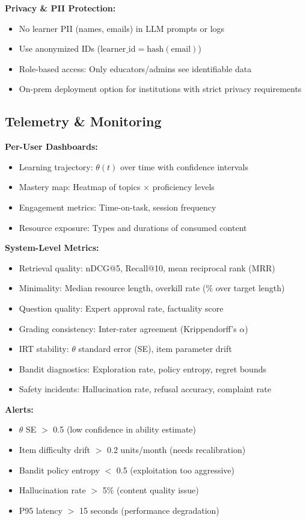 \documentclass[11pt,letterpaper]{article}
\begin{document}
\textbf{Privacy \& PII Protection:}
\begin{itemize}
\item No learner PII (names, emails) in LLM prompts or logs
\item Use anonymized IDs ($\text{learner\_id} = \text{hash}(\text{email})$)
\item Role-based access: Only educators/admins see identifiable data
\item On-prem deployment option for institutions with strict privacy requirements
\end{itemize}

\subsection{Telemetry \& Monitoring}

\textbf{Per-User Dashboards:}
\begin{itemize}
\item Learning trajectory: $\theta(t)$ over time with confidence intervals
\item Mastery map: Heatmap of topics $\times$ proficiency levels
\item Engagement metrics: Time-on-task, session frequency
\item Resource exposure: Types and durations of consumed content
\end{itemize}

\textbf{System-Level Metrics:}
\begin{itemize}
\item Retrieval quality: nDCG@5, Recall@10, mean reciprocal rank (MRR)
\item Minimality: Median resource length, overkill rate (\% over target length)
\item Question quality: Expert approval rate, factuality score
\item Grading consistency: Inter-rater agreement (Krippendorff's $\alpha$)
\item IRT stability: $\theta$ standard error (SE), item parameter drift
\item Bandit diagnostics: Exploration rate, policy entropy, regret bounds
\item Safety incidents: Hallucination rate, refusal accuracy, complaint rate
\end{itemize}

\textbf{Alerts:}
\begin{itemize}
\item $\theta$ SE $>$ 0.5 (low confidence in ability estimate)
\item Item difficulty drift $>$ 0.2 units/month (needs recalibration)
\item Bandit policy entropy $<$ 0.5 (exploitation too aggressive)
\item Hallucination rate $>$ 5\% (content quality issue)
\item P95 latency $>$ 15 seconds (performance degradation)
\end{itemize}
\end{document}
